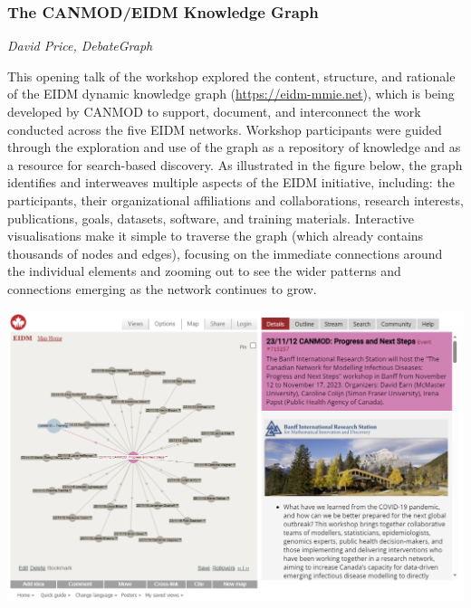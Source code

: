 \subsubsection*{The CANMOD/EIDM Knowledge Graph}
\textit{David Price, DebateGraph}

This opening talk of the workshop explored the content, structure, and rationale of the EIDM dynamic knowledge graph (\url{https://eidm-mmie.net}), which is being developed by CANMOD to support, document, and interconnect the work conducted across the five EIDM networks. Workshop participants were guided through the exploration and use of the graph as a repository of knowledge and as a resource for search-based discovery. As illustrated in the figure below, the graph identifies and interweaves multiple aspects of the EIDM initiative, including: the participants, their organizational affiliations and collaborations, research interests, publications, goals, datasets, software, and training materials. Interactive visualisations make it simple to traverse the graph (which already contains thousands of nodes and edges), focusing on the immediate connections around the individual elements and zooming out to see the wider patterns and connections emerging as the network continues to grow.

\begin{center}
\includegraphics[width=\textwidth]{talk_summaries/EIDM_CANMOD.png}
\end{center}
